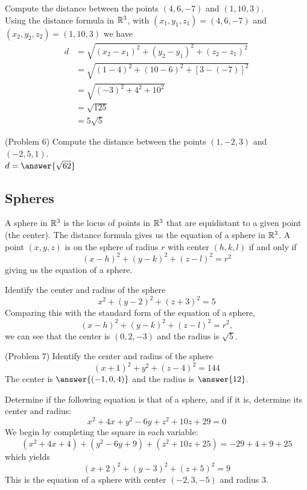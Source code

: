 \documentclass[handout]{ximera}
\begin{document}

\begin{example}[Example 6]
Compute the distance between the points $(4, 6, -7)$ and $(1,10, 3)$.\\
Using the distance formula in $\mathbb R^3$, with $(x_1, y_1, z_1) = (4,6,-7)$ and $(x_2, y_2, z_2) = (1,10,3)$ we have
\begin{align*}
d &= \sqrt{(x_2 -x_1)^2+(y_2 -y_1)^2+(z_2 -z_1)^2}\\
  &= \sqrt{(1-4)^2+(10-6 )^2+[3-(-7)]^2}\\
  &= \sqrt{(-3)^2 + 4^2 +10^2}\\
  &= \sqrt{125}\\
  &= 5\sqrt 5
\end{align*}

\end{example}
\begin{problem}(Problem 6) 
Compute the distance between the points $(1, -2, 3)$ and $(-2, 5, 1)$.\\
$d = \answer{\sqrt{62}}$
\end{problem}


\subsection{Spheres}
A sphere in $\mathbb R^3$ is the locus of points in $\mathbb R^3$ that are equidistant to a given point (the center).
The distance formula gives us the equation of a sphere in $\mathbb R^3$.  A point $(x, y, z)$ is on the sphere of radius $r$ with center $(h, k, l)$
if and only if
\[
(x-h)^2 + (y-k)^2 + (z -l)^2 = r^2
\]
giving us the equation of a sphere.

\begin{example}[Example 7]
Identify the center and radius of the sphere 
\[
x^2 + (y-2)^2 + (z+3)^2 = 5
\]
Comparing this with the standard form of the equation of a sphere,
\[
(x-h)^2 + (y-k)^2 + (z -l)^2 = r^2,
\]
we can see that the center is $(0, 2, -3)$ and the radius is $\sqrt 5$.
\end{example}

\begin{problem}(Problem 7)
Identify the center and radius of the sphere 
\[
(x+1)^2 + y^2 + (z-4)^2 = 144
\]
The center is $\answer{(-1, 0, 4)}$ and the radius is $\answer{12}$.
\end{problem}


\begin{example}[Example 8]
Determine if the following equation is that of a sphere, and if it is, determine its center and radius:
\[
x^2 + 4x + y^2 - 6y + z^2 + 10z + 29 = 0
\]
We begin by completing the square in each variable:
\[
(x^2 + 4x + 4) + (y^2 - 6y + 9) + (z^2 + 10z + 25) =-29 + 4 + 9 + 25
\]
which yields
\[
(x+2)^2 +(y-3)^2 + (z+5)^2 = 9
\]
This is the equation of a sphere with center $(-2, 3, -5)$ and radius $3$. 
\end{example}
\end{document}
